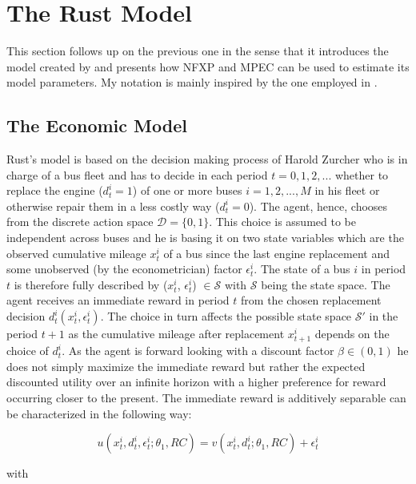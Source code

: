 \section{The Rust Model}
\thispagestyle{plain} %

This section follows up on the previous one in the sense that it introduces the model created by \cite{Rust.1987} and presents how NFXP and MPEC can be used to estimate its model parameters. My notation is mainly inspired by the one employed in \cite{Su.Judd.2012}. 

\subsection{The Economic Model}

Rust's model is based on the decision making process of Harold Zurcher who is in charge of a bus fleet and has to decide in each period $t = 0, 1, 2, ...$ whether to replace the engine ($d^i_t=1$) of one or more buses $i = 1, 2, ..., M$ in his fleet or otherwise repair them in a less costly way ($d^i_t=0$). The agent, hence, chooses from the discrete action space $\mathcal{D} = \{0, 1\}$. This choice is assumed to be independent across buses and he is basing it on two state variables which are the observed cumulative mileage $x^i_t$ of a bus since the last engine replacement and some unobserved (by the econometrician) factor $\epsilon^i_t$. The state of a bus $i$ in period $t$ is therefore fully described by ($x^i_t$, $\epsilon^i_t$) $\in \mathcal{S}$ with $\mathcal{S}$ being the state space. The agent receives an immediate reward in period $t$ from the chosen replacement decision $d^i_t(x^i_t, \epsilon^i_t)$. The choice in turn affects the possible state space $\mathcal{S'}$ in the period $t+1$ as the cumulative mileage after replacement $x^i_{t+1}$ depends on the choice of $d^i_t$. As the agent is forward looking with a discount factor $\beta \in (0, 1)$ he does not simply maximize the immediate reward but rather the expected discounted utility over an infinite horizon with a higher preference for reward occurring closer to the present. The immediate reward is additively separable can be characterized in the following way: 

\begin{equation}
	u(x^i_t, d^i_t, \epsilon^i_t; \theta_1, RC) = v(x^i_t, d^i_t; \theta_1, RC) + \epsilon^i_t
\end{equation}

with 

